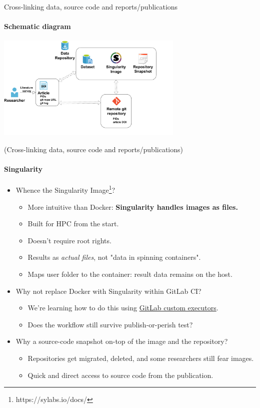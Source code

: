 \documentclass[
	aspectratio=169,%
	color={accentcolor=2d},
	logo=true,%
	colorframetitle=true,%
	]{tudabeamer}
\begin{document}
\begin{frame}{Cross-linking data, source code and reports/publications} 
	\framesubtitle{Schematic diagram}
	
	\begin{center}
		\includegraphics[width=0.67\textwidth]{figures/cross-linking.pdf}
	\end{center}

\end{frame}

\begin{frame}{(Cross-linking data, source code and reports/publications)} 
    \framesubtitle{Singularity} 
        
    \vfill
    \begin{itemize}
        \item Whence the Singularity Image\footnote{https://sylabs.io/docs/}?
            \begin{itemize}
                \item More intuitive than Docker: \textbf{Singularity handles images as files.} 
                \item Built for HPC from the start. 
                \item Doesn't require root rights. 
                \item Results as \emph{actual files}, not "data in spinning containers". 
                \item Maps user folder to the container: result data remains on the host. 
            \end{itemize}
        \item Why not replace Docker with Singularity within GitLab CI? 
            \begin{itemize}
                \item We're learning how to do this using \href{https://docs.gitlab.com/runner/executors/custom.html}{GitLab custom executors}.
                \item Does the workflow still survive publish-or-perish \faGraduationCap test?
            \end{itemize}
        \item Why a source-code snapshot on-top of the image and the repository? 
            \begin{itemize}
                \item Repositories get migrated, deleted, and some researchers still fear images. 
                \item Quick and direct access to source code from the publication. 
            \end{itemize}
    \end{itemize}

\end{frame}
\end{document}
